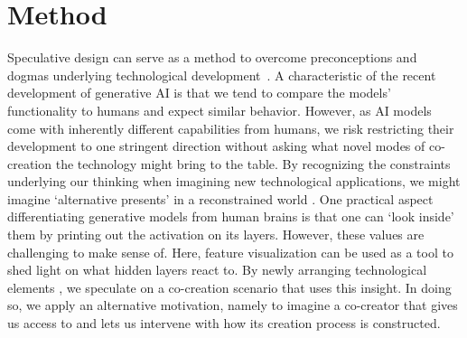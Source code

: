 \documentclass[manuscript]{acmart}
\begin{document}
\section{Method}
Speculative design can serve as a method to overcome preconceptions and dogmas underlying technological development~\cite{auger_reconstrained_2017}. A characteristic of the recent development of generative AI is that we tend to compare the models' functionality to humans and expect similar behavior.
However, as AI models come with inherently different capabilities from humans, we risk restricting their development to one stringent direction without asking what novel modes of co-creation the technology might bring to the table. 
By recognizing the constraints underlying our thinking when imagining new technological applications, we might imagine `alternative presents' in a reconstrained world \cite{auger_reconstrained_2017}. 
One practical aspect differentiating generative models from human brains
is that one can `look inside' them by printing out the activation on its layers. However, these values are challenging to make sense of. Here, feature visualization can be used as a tool to shed light on what hidden layers react to.
By newly arranging technological elements \cite{auger_reconstrained_2017}, we speculate on a co-creation scenario that uses this insight.
In doing so, we apply an alternative motivation, namely to imagine a co-creator that gives us access to and lets us intervene with how its creation process is constructed.
\end{document}
